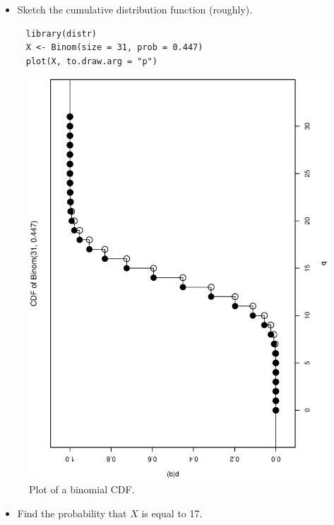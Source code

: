 \documentclass[captions=tableheading]{scrbook}
\begin{document}
\begin{xca}
\begin{itemize}
\item Sketch the cumulative distribution function (roughly).
\end{itemize}

\begin{verbatim}
     library(distr)
     X <- Binom(size = 31, prob = 0.447)
     plot(X, to.draw.arg = "p")
\end{verbatim}


     \begin{figure}[th]
	      \includegraphics[angle=270, totalheight=4in]{img/binompxca.ps}
	      \caption[Plot of a binomial CDF]{\small Plot of a binomial CDF.}
	      \label{fig:binompxca}
	    \end{figure}

\begin{itemize}
\item Find the probability that \(X\) is equal to 17.
\end{itemize}


\end{xca}
\end{document}
